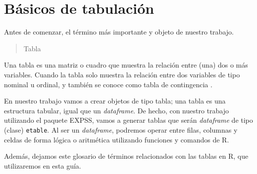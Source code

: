 \documentclass[
]{book}
\begin{document}
\hypertarget{buxe1sicos-de-tabulaciuxf3n}{%
\section{Básicos de tabulación}\label{buxe1sicos-de-tabulaciuxf3n}}

Antes de comenzar, el término más importante y objeto de nuestro trabajo.

\begin{quote}
Tabla
\end{quote}

Una tabla es una matriz o cuadro que muestra la relación entre (una) dos o más variables. Cuando la tabla solo muestra la relación entre dos variables de tipo nominal u ordinal, y también se conoce como tabla de contingencia \citep{sanchez1989analisis}.

En nuestro trabajo vamos a crear objetos de tipo tabla; una tabla es una estructura tabular, igual que un \emph{dataframe}. De hecho, con nuestro trabajo utilizando el paquete EXPSS, vamos a generar tablas que serán \emph{dataframe} de tipo (clase) \texttt{etable}. Al ser un \emph{dataframe}, podremos operar entre filas, columnas y celdas de forma lógica o aritmética utilizando funciones y comandos de R.

Además, dejamos este glosario de términos relacionados con las tablas en R, que utilizaremos en esta guía.
\end{document}
